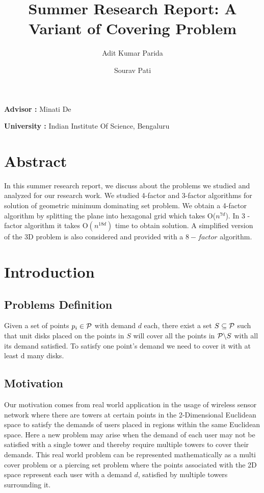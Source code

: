\documentclass[a4paper,10pt]{article}  %
\title{ Summer Research Report: A Variant of Covering Problem }  %
\author[1] {Adit Kumar Parida}
\author[1]{Sourav Pati}
\affil[1]{National Institute of Technology Silchar, India\\
	
	
	\texttt{\{souravpati, aditparida\}@student.nits.ac.in}}
\begin{document}
	
		\maketitle
		\begin{center}
					\large \textbf{Advisor :} Minati De
					
					
					\large\textbf{University :} Indian Institute Of Science, Bengaluru
		\end{center}

	
	
	\cleardoublepage
	\tableofcontents
	\cleardoublepage
	\section{Abstract}
		
		\large In this summer research report, we discuss about the problems we studied and analyzed for our research work. We studied 4-factor and 3-factor algorithms for solution of geometric minimum dominating set problem. We obtain a 4-factor algorithm by splitting the plane into hexagonal grid which takes O($n^{7d}$). In 3 - factor algorithm it takes O$(n^{18d})$ time to obtain solution. A simplified version of the 3D problem is also considered and provided with a $8 - factor$ algorithm.
	
	\cleardoublepage
	
	
	\section{Introduction}
	\subsection{Problems Definition}
	
	\large Given a set of points $p_i \in {\cal P}$ with demand $d$ each, there exist a set $S \subseteq {\cal P}$ such that unit disks placed on the points in $S$ will cover all the points in ${\cal P}  \backslash  S$ with all its demand satisfied. To satisfy one point's demand we need to cover it with at least d many disks. 
	
	\subsection{Motivation}
	
	\large Our motivation comes from real world application in the usage of wireless sensor network where there are towers at certain points in the 2-Dimensional Euclidean space to satisfy the demands of users placed in regions within the same Euclidean space. Here a new problem may arise when the demand of  each user may not be satisfied with a single tower and thereby require multiple towers to cover their demands. This real world problem can be represented mathematically as a multi cover problem or a piercing set problem where the points associated with the 2D space represent each user with a demand $d$, satisfied by multiple towers surrounding it.
	
\end{document}
